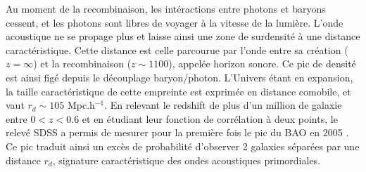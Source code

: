 \documentclass[../main/main.tex]{subfiles}
\begin{document}
Au moment de la recombinaison, les intéractions entre photons et baryons cessent,
et les photons sont libres de voyager à la vitesse de la lumière. L'onde acoustique ne se
propage plus et laisse ainsi une zone de surdensité à une distance
caractéristique. Cette distance est celle 
parcourue par l'onde entre sa création ($z=\infty$) et la
recombinaison ($z\sim1100$), appelée horizon sonore. Ce pic de densité est ainsi figé
depuis le découplage baryon/photon. L'Univers étant en expansion, la
taille caractéristique de cette empreinte est exprimée en distance
comobile, et vaut $r_{d}\sim105$ Mpc.h$^{-1}$.
En relevant le redshift de plus d'un million de galaxie entre $0<z<0.6$
et en étudiant leur fonction de corrélation à deux points,
le relevé SDSS \citep{YorkSDSS2000} a permis de mesurer pour la première fois le pic du BAO
en 2005 \citep[Figure~\ref{fig:baopeak};][]{Eisenstein}. Ce pic traduit ainsi un excès de probabilité d'observer 2 galaxies
séparées par une distance $r_{d}$, signature caractéristique des ondes
acoustiques primordiales. 
\end{document}
